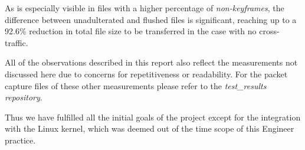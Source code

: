 As is especially visible in files with a higher percentage of \textit{non-keyframes}, the difference between unadulterated and flushed files is significant, reaching up to a 92.6\% reduction in total file size to be transferred in the case with no cross-traffic.

All of the observations described in this report also reflect the measurements not discussed here due to concerns for repetitiveness or readability. For the packet capture files of these other measurements please refer to the \textit{test\_results repository}.

Thus we have fulfilled all the initial goals of the project except for the integration with the Linux kernel, which was deemed out of the time scope of this Engineer practice.